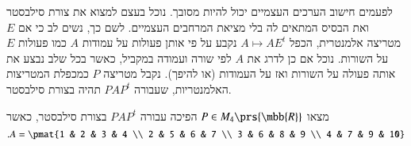 \documentclass[a4paper,10pt,oneside,openany]{article}
\begin{document}
\begin{remark}
לפעמים חישוב הערכים העצמיים יכול להיות מסובך. נוכל בעצם למצוא את צורת סילבסטר ואת הבסיס המתאים לה בלי מציאת המרחבים העצמיים.
לשם כך, נשים לב כי אם
$E$
מטריצה אלמנטרית, הכפל
$A \mapsto A E^t$
נקבע על פי אותן פעולות על עמודות
$A$
כמו פעולות
$E$
על השורות. נוכל אם כן לדרג את
$A$
לפי שורה ועמודה במקביל, כאשר בכל שלב נבצע את אותה פעולה על השורות ואז על העמודות (או להיפך). נקבל מטריצה
$P$
כמכפלת המטריצות האלמנטריות, שעבורה
$PAP^t$
תהיה בצורת סילבסטר.
\end{remark}

\begin{exercise}
מצאו
$P \in M_4\prs{\mbb{R}}$
הפיכה עבורה
$P A P^t$
בצורת סילבסטר, כאשר
\[\text{.} A = \pmat{1 & 2 & 3 & 4 \\ 2 & 5 & 6 & 7 \\ 3 & 6 & 8 & 9 \\ 4 & 7 & 9 & 10}\]
\end{exercise}
\end{document}
